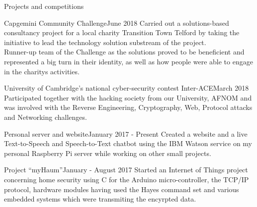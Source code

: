 \documentclass{resume} %
\newcommand{\quotes}[1]{``#1''}
\begin{document}
\newpage

\begin{rSection}{Projects and competitions}

\begin{rSubsection}{Capgemini Community Challenge}{June 2018}{}{}
Carried out a solutions-based consultancy project for a local charity Transition Town Telford by taking the initiative to lead the technology solution substream of the project.
\\Runner-up team of the Challenge as the solutions proved to be beneficient and represented a big turn in their identity, as well as how people were able to engage in the charity\textsc{}s activities.
\end{rSubsection}

\begin{rSubsection}{University of Cambridge’s national cyber-security contest Inter-ACE}{March 2018}{}{}
Participated together with the hacking society from our University, AFNOM and was involved with the Reverse Engineering, Cryptography, Web, Protocol attacks and Networking challenges.
\end{rSubsection}

\begin{rSubsection}{Personal server and website}{January 2017 - Present}{}{}
Created a website and a live Text-to-Speech and Speech-to-Text chatbot using the IBM Watson service on my personal Raspberry Pi server while working on other small projects.
\end{rSubsection}

\begin{rSubsection}{Project \quotes{myHaum}}{January - August 2017}{}{}
Started an Internet of Things project concerning home security using C for the Arduino micro-controller, the TCP/IP protocol, hardware modules having used the Hayes command set and various embedded systems which were transmiting the encyrpted data.
\end{rSubsection}


\end{rSection}

\end{document}
